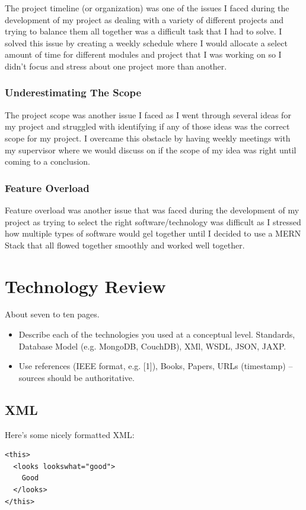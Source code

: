 The project timeline (or organization) was one of the issues I faced during the development of my project as dealing with a variety of different projects and trying to balance them all together was a difficult task that I had to solve. I solved this issue by creating a weekly schedule where I would allocate a select amount of time for different modules and project that I was working on so I didn't focus and stress about one project more than another.

\subsection{Underestimating The Scope}

The project scope was another issue I faced as I went through several ideas for my project and struggled with identifying if any of those ideas was the correct scope for my project. I overcame this obstacle by having weekly meetings with my supervisor where we would discuss on if the scope of my idea was right until coming to a conclusion.

\subsection{Feature Overload}

Feature overload was another issue that was faced during the development of my project as trying to select the right software/technology was difficult as I stressed how multiple types of software would gel together until I decided to use a MERN Stack that all flowed together smoothly and worked well together.

\chapter{Technology Review}
About seven to ten pages.
\begin{itemize}
\item Describe each of the technologies you used at a conceptual level. Standards, Database Model (e.g. MongoDB, CouchDB), XMl, WSDL, JSON, JAXP.
\item Use references (IEEE format, e.g. [1]), Books, Papers, URLs (timestamp) – sources should be authoritative. 
\end{itemize}

\section{XML}
Here's some nicely formatted XML:
\begin{verbatim}
<this>
  <looks lookswhat="good">
    Good
  </looks>
</this>
\end{verbatim}

